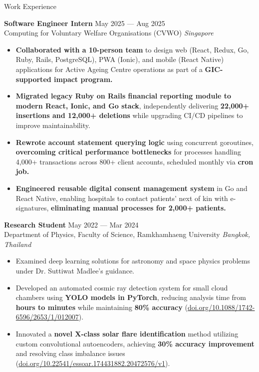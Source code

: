 \documentclass{phanuphat_srisukhawasu_resume} %
\begin{document}
\begin{rSection}{Work Experience}

  \textbf{Software Engineer Intern} \hfill May 2025 --- Aug 2025 \\
  Computing for Voluntary Welfare Organisations (CVWO) \hfill \textit{Singapore}
  \begin{itemize}
    \item \textbf{Collaborated with a 10-person team} to design web (React, Redux, Go, Ruby, Rails, PostgreSQL), PWA (Ionic), and mobile (React Native) applications for Active Ageing Centre operations as part of a \textbf{GIC-supported impact program.}
    \item \textbf{Migrated legacy Ruby on Rails financial reporting module to modern React, Ionic, and Go stack}, independently delivering \textbf{22,000+ insertions and 12,000+ deletions} while upgrading CI/CD pipelines to improve maintainability.
    \item \textbf{Rewrote account statement querying logic} using concurrent goroutines, \textbf{overcoming critical performance bottlenecks} for processes handling 4,000+ transactions across 800+ client accounts, scheduled monthly via \textbf{cron job.}
    \item \textbf{Engineered reusable digital consent management system} in Go and React Native, enabling hospitals to contact patients' next of kin with e-signatures, \textbf{eliminating manual processes for 2,000+ patients.}
  \end{itemize}

  \textbf{Research Student} \hfill May 2022 --- Mar 2024 \\
  Department of Physics, Faculty of Science, Ramkhamhaeng University \hfill \textit{Bangkok, Thailand}
  \begin{itemize}
    \item Examined deep learning solutions for astronomy and space physics problems under Dr. Suttiwat Madlee's guidance.   
    \item Developed an automated cosmic ray detection system for small cloud chambers using \textbf{YOLO models in PyTorch}, reducing analysis time from \textbf{hours to minutes} while maintaining \textbf{80\% accuracy} (\href{https://iopscience.iop.org/article/10.1088/1742-6596/2653/1/012007}{doi.org/10.1088/1742-6596/2653/1/012007}).
    \item Innovated a \textbf{novel X-class solar flare identification} method utilizing custom convolutional autoencoders, achieving \textbf{30\% accuracy improvement} and resolving class imbalance issues (\href{https://essopenarchive.org/users/803138/articles/1189366-enhancing-strong-solar-flare-prediction-using-convolutional-autoencoders-for-anomaly-detection-on-hmi-magnetograms}{doi.org/10.22541/essoar.174431882.20472576/v1}).
  \end{itemize}

\end{rSection} 
\end{document}
